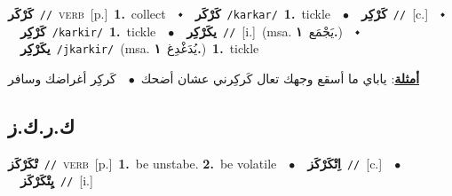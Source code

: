 \documentclass[10pt,a4paper,twoside]{article} %
\begin{document}
\begin{multicols}{2}
{\setlength\topsep{0pt}\textbf{\foreignlanguage{arabic}{كَرْكَر}}\ {\color{gray}\texttt{//}\color{black}}\ \textsc{verb}\ [p.]\ \textbf{1.}~collect\ \ $\smblkdiamond$\ \ \setlength\topsep{0pt}\textbf{\foreignlanguage{arabic}{كَرْكَر}}\ {\color{gray}\texttt{/karkar/}\color{black}}\ \textbf{1.}~tickle\ \ $\bullet$\ \ \setlength\topsep{0pt}\textbf{\foreignlanguage{arabic}{كَرْكِر}}\ {\color{gray}\texttt{//}\color{black}}\ [c.]\ \ $\smblkdiamond$\ \ \setlength\topsep{0pt}\textbf{\foreignlanguage{arabic}{كَرْكِر}}\ {\color{gray}\texttt{/karkir/}\color{black}}\ \textbf{1.}~tickle\ \ $\bullet$\ \ \setlength\topsep{0pt}\textbf{\foreignlanguage{arabic}{يكَرْكِر}}\ {\color{gray}\texttt{//}\color{black}}\ [i.]\ \color{gray}(msa. \foreignlanguage{arabic}{يَجْمَع}~\foreignlanguage{arabic}{\textbf{١.}})\color{black}\ \ $\smblkdiamond$\ \ \setlength\topsep{0pt}\textbf{\foreignlanguage{arabic}{يكَرْكِر}}\ {\color{gray}\texttt{/jkarkir/}\color{black}}\ \color{gray}(msa. \foreignlanguage{arabic}{يُدَغْدِغ}~\foreignlanguage{arabic}{\textbf{١.}})\color{black}\ \textbf{1.}~tickle\  \begin{flushright}\color{gray}\foreignlanguage{arabic}{\textbf{\underline{\foreignlanguage{arabic}{أمثلة}}}: ياباي ما أسقع وجهك تعال كَركِرني عشان أضحك\ $\bullet$\ \  كَركِر أغراضك وسافر}\end{flushright}\color{black}} \vspace{2mm}

\vspace{-3mm}
\subsection*{\color{blue}\foreignlanguage{arabic}{ك.ر.ك.ز}\color{blue}{}} 

{\setlength\topsep{0pt}\textbf{\foreignlanguage{arabic}{تْكَرْكَز}}\ {\color{gray}\texttt{//}\color{black}}\ \textsc{verb}\ [p.]\ \textbf{1.}~be unstabe.  \textbf{2.}~be volatile\ \ $\bullet$\ \ \setlength\topsep{0pt}\textbf{\foreignlanguage{arabic}{اِتْكَرْكَز}}\ {\color{gray}\texttt{//}\color{black}}\ [c.]\ \ $\bullet$\ \ \setlength\topsep{0pt}\textbf{\foreignlanguage{arabic}{يِتْكَرْكَز}}\ {\color{gray}\texttt{//}\color{black}}\ [i.]\ } \vspace{2mm}


\end{multicols}
\end{document}
